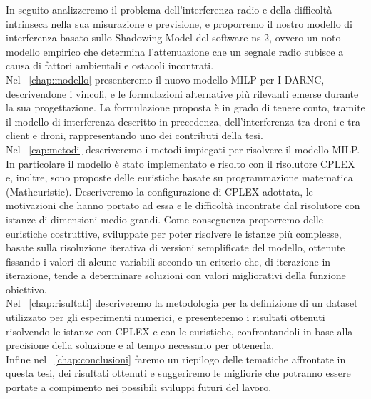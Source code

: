 In seguito analizzeremo il problema dell'interferenza radio e della difficoltà intrinseca nella sua misurazione e previsione, e proporremo il nostro modello di interferenza basato sullo Shadowing Model del software ns-2, ovvero un noto modello empirico che determina l'attenuazione che un segnale radio subisce a causa di fattori ambientali e ostacoli incontrati. \\
Nel \chaptername\ \ref{chap:modello} presenteremo il nuovo modello MILP per I-DARNC, descrivendone i vincoli, e le formulazioni alternative più rilevanti emerse durante la sua progettazione. La formulazione proposta è in grado di tenere conto, tramite il modello di interferenza descritto in precedenza, dell'interferenza tra droni e tra client e droni, rappresentando uno dei contributi della tesi.\\
Nel \chaptername\ \ref{cap:metodi} descriveremo i metodi impiegati per risolvere il modello MILP. In particolare il modello è stato implementato e risolto con il risolutore CPLEX e, inoltre, sono proposte delle euristiche basate su programmazione matematica (Matheuristic). 
Descriveremo la configurazione di CPLEX adottata, le motivazioni che hanno portato ad essa e le difficoltà incontrate dal risolutore con istanze di dimensioni medio-grandi. 
Come conseguenza proporremo delle euristiche costruttive, sviluppate per poter risolvere le istanze più complesse, basate sulla risoluzione iterativa di versioni semplificate del modello, ottenute fissando i valori di alcune variabili secondo un criterio che, di iterazione in iterazione, tende a determinare soluzioni con valori migliorativi della funzione obiettivo. \\
Nel \chaptername\ \ref{chap:risultati} descriveremo la metodologia per la definizione di un dataset utilizzato per gli esperimenti numerici, e presenteremo i risultati ottenuti risolvendo le istanze con CPLEX e con le euristiche, confrontandoli in base alla precisione della soluzione e al tempo necessario per ottenerla.\\
Infine nel \chaptername\ \ref{chap:conclusioni} faremo un riepilogo delle tematiche affrontate in questa tesi, dei risultati ottenuti e suggeriremo le migliorie che potranno essere portate a compimento nei possibili sviluppi futuri del lavoro. \\

